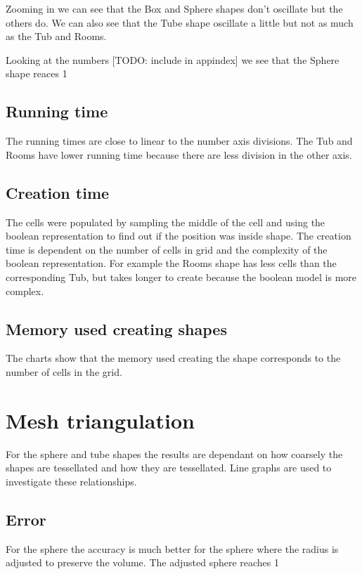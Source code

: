 \documentclass[11pt,twoside,a4paper]{report}
\begin{document}
Zooming in we can see that the Box and Sphere shapes don’t oscillate but the others do. We can also see that the Tube shape oscillate a little but not as much as the Tub and Rooms.

Looking at the numbers [TODO: include in appindex] we see that the Sphere shape reaces 1%

\subsection{Running time}
The running times are close to linear to the number axis divisions. The Tub and Rooms have lower running time because there are less division in the other axis.

\subsection{Creation time}
The cells were populated by sampling the middle of the cell and using the boolean representation to find out if the position was inside shape. The creation time is dependent on the number of cells in grid and the complexity of the boolean representation. For example the Rooms shape has less cells than the corresponding Tub, but takes longer to create because the boolean model is more complex.

\subsection{Memory used creating shapes}
The charts show that the memory used creating the shape corresponds to the number of cells in the grid.

\section{Mesh triangulation}
For the sphere and tube shapes the results are dependant on how coarsely the shapes are tessellated and how they are tessellated. Line graphs are used to investigate these relationships.
\subsection{Error}

For the sphere the accuracy is much better for the sphere where the radius is adjusted to preserve the volume. The adjusted sphere reaches 1%
\end{document}
